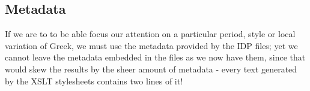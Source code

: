 \subsection{Metadata}
\label{subsect:metadata}

If we are to to be able focus our attention on a particular period, style or
local variation of Greek, we must use the metadata provided by the IDP files;
yet we cannot leave the metadata embedded in the files as we now have them,
since that would skew the results by the sheer amount of metadata - every text
generated by the XSLT stylesheets contains two lines of it!
